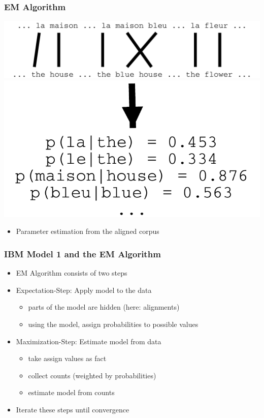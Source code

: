 \begin{frame}
\frametitle{EM Algorithm\koehnref}

\begin{center}
\includegraphics[scale=0.4]{figures/em4.pdf} \\
\includegraphics[scale=0.4]{figures/em-result.pdf}
\end{center}
\begin{itemize}
\item Parameter estimation from the aligned corpus
\end{itemize}

\end{frame}

\begin{frame}
\frametitle{IBM Model 1 and the EM Algorithm\koehnref}

\begin{itemize}[<+->]
\item EM Algorithm consists of two steps
\item Expectation-Step: Apply model to the data
\begin{itemize}
\item parts of the model are hidden (here: alignments)
\item using the model, assign probabilities to possible values
\end{itemize}
\item Maximization-Step: Estimate model from data
\begin{itemize}
\item take assign values as fact
\item collect counts (weighted by probabilities)
\item estimate model from counts
\end{itemize}
\item Iterate these steps until convergence
\end{itemize}

\end{frame}


